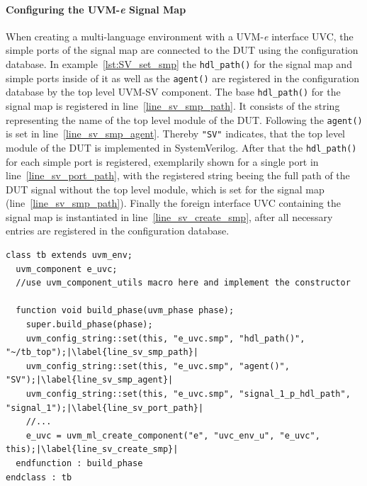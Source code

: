 \paragraph{Configuring the UVM-\textit{e} Signal Map}
When creating a multi-language environment with a UVM-\textit{e} interface UVC, the simple ports of the signal map are connected to the DUT using the configuration database. In example~\ref{lst:SV_set_smp} the \lstinline$hdl_path()$ for the signal map and simple ports inside of it as well as the \lstinline$agent()$ are registered in the configuration database by the top level UVM-SV component. The base \lstinline$hdl_path()$ for the signal map is registered in line~\ref{line_sv_smp_path}. It consists of the string representing the name of the top level module of the DUT. Following the \lstinline$agent()$ is set in line~\ref{line_sv_smp_agent}. Thereby \lstinline$"SV"$ indicates, that the top level module of the DUT is implemented in SystemVerilog. After that the \lstinline$hdl_path()$ for each simple port is registered, exemplarily shown for a single port in line~\ref{line_sv_port_path}, with the registered string beeing the full path of the DUT signal without the top level module, which is set for the signal map (line~\ref{line_sv_smp_path}).
Finally the foreign interface UVC containing the signal map is instantiated in line~\ref{line_sv_create_smp}, after all necessary entries are registered in the configuration database.
\lstset{language=SystemVerilog, numbers = left, escapechar=|, breaklines=true}
\begin{lstlisting}[frame=htrbl, caption={SystemVerilog: configuring the simple ports of the UVM-\textit{e} signal map},
label={lst:SV_set_smp}]
class tb extends uvm_env;
  uvm_component e_uvc;
  //use uvm_component_utils macro here and implement the constructor

  function void build_phase(uvm_phase phase);
    super.build_phase(phase);
    uvm_config_string::set(this, "e_uvc.smp", "hdl_path()",          "~/tb_top");|\label{line_sv_smp_path}|
    uvm_config_string::set(this, "e_uvc.smp", "agent()",             "SV");|\label{line_sv_smp_agent}|
    uvm_config_string::set(this, "e_uvc.smp", "signal_1_p_hdl_path", "signal_1");|\label{line_sv_port_path}|
    //...
    e_uvc = uvm_ml_create_component("e", "uvc_env_u", "e_uvc", this);|\label{line_sv_create_smp}|
  endfunction : build_phase
endclass : tb
\end{lstlisting}
